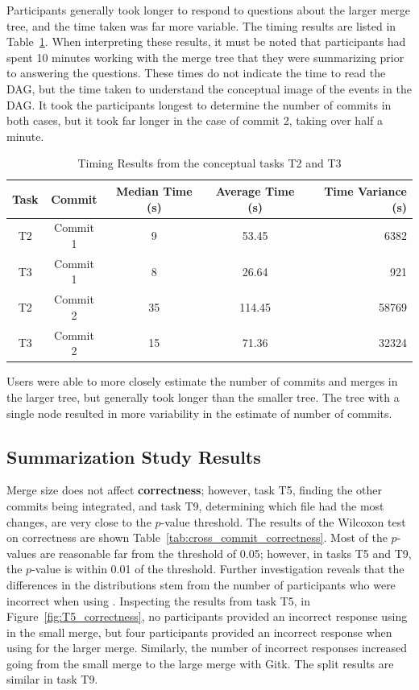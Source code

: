 Participants generally took longer to respond to questions about the
larger merge tree, and the time taken was far more variable. The timing
results are listed in Table~\ref{tab:conceptual_time_results}. When
interpreting these results, it must be noted that participants had spent
10 minutes working with the merge tree that they were summarizing prior
to answering the questions. These times do not indicate the time to read
the DAG, but the time taken to understand the conceptual image of the
events in the DAG. It took the participants longest to determine the
number of commits in both cases, but it took far longer in the case of
commit 2, taking over half a minute.

\begin{table}[htpb]
  \centering
  \caption{Timing Results from the conceptual tasks T2 and T3}
  \label{tab:conceptual_time_results}
  \begin{tabular}{ccccr}
    \toprule
    Task & Commit   & Median Time (s) & Average Time (s) & Time Variance (s)\\\midrule
    T2   & Commit 1 & 9               & 53.45            & 6382\\
    T3   & Commit 1 & 8               & 26.64            & 921\\
    T2   & Commit 2 & 35              & 114.45           & 58769\\
    T3   & Commit 2 & 15              & 71.36            & 32324\\
    \bottomrule
  \end{tabular}
\end{table}

Users were able to more closely estimate the number of commits and
merges in the larger tree, but generally took longer than the smaller
tree. The tree with a single node resulted in more variability in the
estimate of number of commits.

\subsection{Summarization Study Results}
\label{sub:summarization_results}

Merge size does not affect \textbf{correctness}; however, task T5,
finding the other commits being integrated, and task T9, determining
which file had the most changes, are very close to the $p$-value
threshold. The results of the Wilcoxon test on correctness are shown
Table~\ref{tab:cross_commit_correctness}. Most of the $p$-values are
reasonable far from the threshold of 0.05; however, in tasks T5 and T9,
the $p$-value is within 0.01 of the threshold. Further investigation
reveals that the differences in the distributions stem from the number
of participants who were incorrect when using \tool{}. Inspecting the
results from task T5, in Figure~\ref{fig:T5_correctness}, no
participants provided an incorrect response using \tool{} in the small
merge, but four participants provided an incorrect response when using
\tool{} for the larger merge. Similarly, the number of incorrect
responses increased going from the small merge to the large merge with
Gitk. The split results are similar in task T9.

